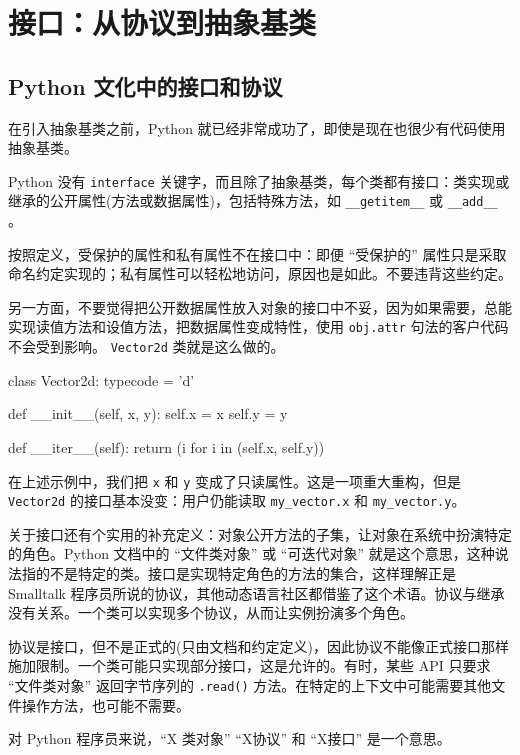 \section{接口：从协议到抽象基类}
\subsection{Python 文化中的接口和协议}

在引入抽象基类之前，Python 就已经非常成功了，即使是现在也很少有代码使用抽象基类。

Python 没有 \texttt{interface} 关键字，而且除了抽象基类，每个类都有接口：类实现或继承的公开属性(方法或数据属性)，包括特殊方法，如 \texttt{\_\_getitem\_\_} 或 \texttt{\_\_add\_\_} 。

按照定义，受保护的属性和私有属性不在接口中：即便 ``受保护的'' 属性只是采取命名约定实现的；私有属性可以轻松地访问，原因也是如此。不要违背这些约定。

另一方面，不要觉得把公开数据属性放入对象的接口中不妥，因为如果需要，总能实现读值方法和设值方法，把数据属性变成特性，使用 \texttt{obj.attr} 句法的客户代码不会受到影响。 \texttt{Vector2d} 类就是这么做的。

\begin{python}
class Vector2d:
    typecode = 'd'

    def __init__(self, x, y):
        self.x = x
        self.y = y

    def __iter__(self):
        return (i for i in (self.x, self.y))
\end{python}

在上述示例中，我们把 \texttt{x} 和 \texttt{y} 变成了只读属性。这是一项重大重构，但是 \texttt{Vector2d} 的接口基本没变：用户仍能读取 \texttt{my\_vector.x} 和 \texttt{my\_vector.y}。

关于接口还有个实用的补充定义：对象公开方法的子集，让对象在系统中扮演特定的角色。Python 文档中的 ``文件类对象'' 或 ``可迭代对象'' 就是这个意思，这种说法指的不是特定的类。接口是实现特定角色的方法的集合，这样理解正是 Smalltalk 程序员所说的协议，其他动态语言社区都借鉴了这个术语。协议与继承没有关系。一个类可以实现多个协议，从而让实例扮演多个角色。

协议是接口，但不是正式的(只由文档和约定定义)，因此协议不能像正式接口那样施加限制。一个类可能只实现部分接口，这是允许的。有时，某些 API 只要求 ``文件类对象'' 返回字节序列的 \texttt{.read()} 方法。在特定的上下文中可能需要其他文件操作方法，也可能不需要。

对 Python 程序员来说，``X 类对象'' ``X协议'' 和 ``X接口'' 是一个意思。

